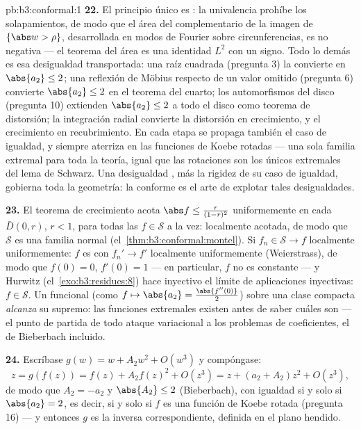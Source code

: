 \begin{solution}{pb:b3:conformal:1}
\textbf{22.} El principio único es
: la univalencia prohíbe los
solapamientos, de modo que el área del complementario de la imagen de
$\{\abs w > \rho\}$, desarrollada en modos de Fourier sobre
circunferencias, es no negativa --- el teorema del área es una identidad
$L^2$ con un signo. Todo lo demás es esa desigualdad transportada: una
raíz cuadrada (pregunta 3) la convierte en $\abs{a_2} \leq 2$; una
reflexión de Möbius respecto de un valor omitido (pregunta 6) convierte
$\abs{a_2} \leq 2$ en el teorema del cuarto; los automorfismos del disco
(pregunta 10) extienden $\abs{a_2}
\leq 2$ a todo el disco como teorema de distorsión; la integración
radial convierte la distorsión en crecimiento, y el crecimiento en
recubrimiento. En cada etapa se propaga también el caso de igualdad, y
siempre aterriza en las funciones de Koebe rotadas --- una sola familia
extremal para toda la teoría, igual que las rotaciones son los únicos
extremales del lema de Schwarz. Una desigualdad
, más la rigidez de su caso
de igualdad, gobierna toda la geometría: la  conforme es
el arte de explotar tales desigualdades.

\textbf{23.} El teorema de crecimiento acota $\abs f \leq
\frac{r}{(1-r)^2}$ uniformemente en cada $\bar D(0, r)$, $r <
1$, para todas las $f \in \mathcal S$ a la vez: localmente acotada, de
modo que $\mathcal S$ es una familia normal
(el~\cref{thm:b3:conformal:montel}). Si $f_n \in \mathcal S \to
f$ localmente uniformemente: $f$ es
 con $f_n' \to f'$ localmente
uniformemente (Weierstrass), de modo que $f(0) = 0$, $f'(0) = 1$ --- en
particular, $f$ no es constante --- y Hurwitz
(el~\cref{exo:b3:residues:8}) hace inyectivo el límite de aplicaciones
inyectivas: $f \in \mathcal S$. Un funcional
 (como
$f \mapsto \abs{a_2} = \frac{\abs{f''(0)}}2$) sobre una clase
compacta \emph{alcanza} su supremo:
las funciones extremales existen antes de saber cuáles son --- el punto
de partida de todo ataque variacional a los problemas de coeficientes,
el de Bieberbach incluido.

\textbf{24.} Escríbase $g(w) = w + A_2w^2 + O(w^3)$ y compóngase:
\[
z = g(f(z)) = f(z) + A_2f(z)^2 + O(z^3)
= z + (a_2 + A_2)z^2 + O(z^3),
\]
de modo que $A_2 = -a_2$ y $\abs{A_2} \leq 2$ (Bieberbach), con igualdad
si y solo si $\abs{a_2} = 2$, es decir, si y solo si $f$ es una función
de Koebe rotada (pregunta 16) --- y entonces $g$ es la inversa
correspondiente, definida en el plano hendido.


\end{solution}
